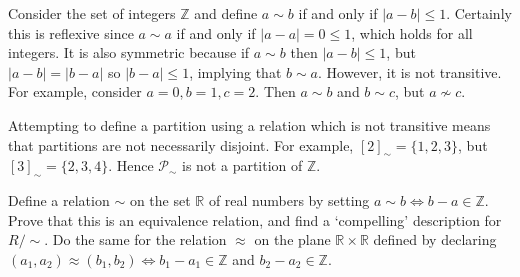 \documentclass[../../master.tex]{subfiles}
\begin{document}
  \begin{solution}
    Consider the set of integers \(\mathbb{Z}\) and define \(a \sim b\) if and only if \(|a - b| \leq 1\).
    Certainly this is reflexive since \(a \sim a\) if and only if \(|a - a| = 0 \leq 1\), which holds for all integers.
    It is also symmetric because if \(a \sim b\) then \(|a - b| \leq 1\), but \(|a - b| = |b - a|\) so \(|b - a| \leq 1\), implying that \(b \sim a\).
    However, it is not transitive. For example, consider \(a = 0, b = 1, c = 2\). Then \(a \sim b\) and \(b \sim c\), but \(a \nsim c\).

    Attempting to define a partition using a relation which is not transitive means that partitions are not necessarily disjoint. For example, \([2]_{\sim} = \{1, 2, 3\}\), but \([3]_{\sim} = \{2, 3, 4\}\). Hence \(\mathscr{P}_{\sim}\) is not a partition of \(\mathbb{Z}\).
  \end{solution}

  \begin{problem}
    Define a relation \(\sim\) on the set \(\mathbb{R}\) of real numbers by setting \(a \sim b \Longleftrightarrow b - a \in \mathbb{Z}\).
    Prove that this is an equivalence relation, and find a `compelling' description for \(R / {\sim}\).
    Do the same for the relation \(\approx\) on the plane \(\mathbb{R} \times \mathbb{R}\) defined by declaring
    \((a_{1}, a_{2}) \approx (b_{1}, b_{2}) \Longleftrightarrow b_{1} - a_{1} \in \mathbb{Z}\) and \(b_{2} - a_{2} \in \mathbb{Z}\).
  \end{problem}
\end{document}
